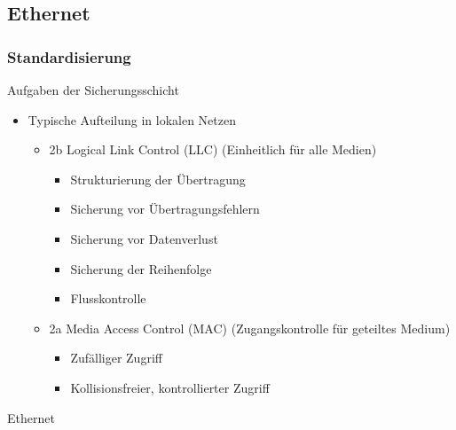   \subsection{Ethernet}
    \subsubsection{Standardisierung}
      Aufgaben der Sicherungsschicht
      \begin{itemize}
        \item Typische Aufteilung in lokalen Netzen
          \begin{itemize}
            \item 2b Logical Link Control (LLC) (Einheitlich für alle Medien)
              \begin{itemize}
                \item Strukturierung der Übertragung
                \item Sicherung vor Übertragungsfehlern
                \item Sicherung vor Datenverlust
                \item Sicherung der Reihenfolge
                \item Flusskontrolle
              \end{itemize}
            \item 2a Media Access Control (MAC) (Zugangskontrolle für geteiltes Medium)
              \begin{itemize}
                \item Zufälliger Zugriff
                \item Kollisionsfreier, kontrollierter Zugriff
              \end{itemize}
          \end{itemize}
      \end{itemize}
      Ethernet
